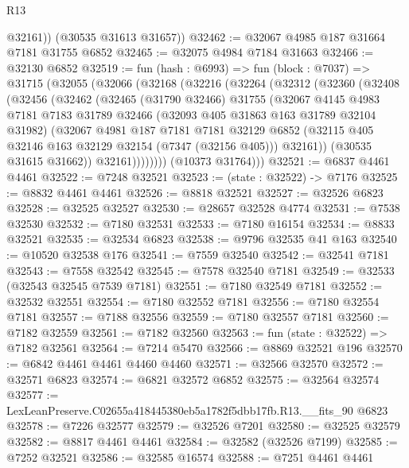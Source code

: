 \begin{lexlean}{R13}
\begin{coremodule}
          @32161))
      (@30535 @31613 @31657))
@32462 := @32067 @4985 @187 @31664 @7181 @31755 @6852
@32465 := @32075 @4984 @7184 @31663
@32466 := @32130 @6852
@32519 := fun (hash : @6993) =>
  fun (block : @7037) =>
  @31715
    (@32055
      (@32066
        (@32168
          (@32216
            (@32264
              (@32312
                (@32360
                  (@32408
                    (@32456
                      (@32462
                        (@32465
                          (@31790 @32466)
                          @31755
                          (@32067
                            @4145
                            @4983
                            @7181
                            @7183
                            @31789
                            @32466
                            (@32093 @405 @31863 @163 @31789 @32104 @31982)
                            (@32067
                              @4981
                              @187
                              @7181
                              @7181
                              @32129
                              @6852
                              (@32115 @405 @32146 @163 @32129 @32154 (@7347 (@32156 @405)))
                              @32161))
                          (@30535 @31615 @31662))
                        @32161))))))))
        (@10373 @31764)))
@32521 := @6837 @4461 @4461
@32522 := @7248 @32521
@32523 := (state : @32522) -> @7176
@32525 := @8832 @4461 @4461
@32526 := @8818 @32521
@32527 := @32526 @6823
@32528 := @32525 @32527
@32530 := @28657 @32528 @4774
@32531 := @7538 @32530
@32532 := @7180 @32531
@32533 := @7180 @16154
@32534 := @8833 @32521
@32535 := @32534 @6823
@32538 := @9796 @32535 @41 @163
@32540 := @10520 @32538 @176
@32541 := @7559 @32540
@32542 := @32541 @7181
@32543 := @7558 @32542
@32545 := @7578 @32540 @7181
@32549 := @32533 (@32543 @32545 @7539 @7181)
@32551 := @7180 @32549 @7181
@32552 := @32532 @32551
@32554 := @7180 @32552 @7181
@32556 := @7180 @32554 @7181
@32557 := @7188 @32556
@32559 := @7180 @32557 @7181
@32560 := @7182 @32559
@32561 := @7182 @32560
@32563 := fun (state : @32522) => @7182 @32561
@32564 := @7214 @5470
@32566 := @8869 @32521 @196
@32570 := @6842 @4461 @4461 @4460 @4460
@32571 := @32566 @32570
@32572 := @32571 @6823
@32574 := @6821 @32572 @6852
@32575 := @32564 @32574
@32577 := LexLeanPreserve.C02655a418445380eb5a1782f5dbb17fb.R13.__fits_90 @6823
@32578 := @7226 @32577
@32579 := @32526 @7201
@32580 := @32525 @32579
@32582 := @8817 @4461 @4461
@32584 := @32582 (@32526 @7199)
@32585 := @7252 @32521
@32586 := @32585 @16574
@32588 := @7251 @4461 @4461

\end{coremodule}
\end{lexlean}
